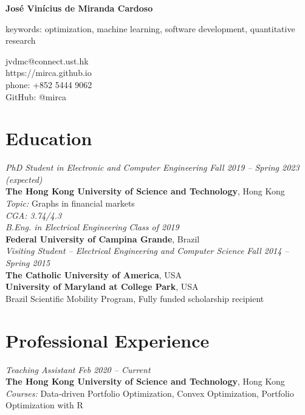 \documentclass[10pt]{article}
\begin{document}
\pagestyle{empty}
\begin{titlepage}
     {\Large{\textbf{Jos\'e Vin\'icius de Miranda Cardoso}}}
     \vspace{.5cm}

    \begin{minipage}[b]{10.5cm}
      keywords: optimization, machine learning, software development, quantitative research
    \end{minipage}
    \hfill
    \begin{minipage}[b]{5cm}
        \textsf{jvdmc@connect.ust.hk}\\
        \textsf{https://mirca.github.io}\\
        \textsf{phone: +852 5444 9062}\\
        \textsf{GitHub: @mirca}
    \end{minipage}


\section*{Education}

\emph{PhD Student in Electronic and Computer Engineering} \hfill \textit{Fall 2019 -- Spring 2023 (expected)} \\
\textbf{The Hong Kong University of Science and Technology}, Hong Kong\\
\textit{Topic:} Graphs in financial markets\\
\textit{CGA: 3.74/4.3}\\

\emph{B.Eng. in Electrical Engineering} \hfill \textit{Class of 2019} \\
\textbf{Federal University of Campina Grande}, Brazil \\

\emph{Visiting Student -- Electrical Engineering and Computer Science} \hfill \textit{Fall 2014 -- Spring 2015} \\
\textbf{The Catholic University of America}, USA\\
\textbf{University of Maryland at College Park}, USA \\
Brazil Scientific Mobility Program, Fully funded scholarship recipient

\section*{Professional Experience}


\emph{Teaching Assistant} \hfill \textit{Feb 2020 -- Current}
\\ \textbf{The Hong Kong University of Science and Technology}, Hong Kong
  \\ {\small\textit{Courses:} Data-driven Portfolio Optimization, Convex Optimization, Portfolio Optimization with \textsf{R}}
\vspace{.5cm}


\end{titlepage}
\end{document}
